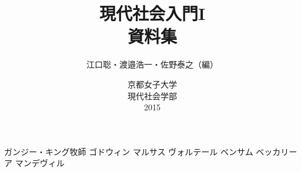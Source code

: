 \documentclass[dvipdfmx,openany,twocolumn]{jsbook}
\author{江口聡・渡邉浩一・佐野泰之（編）}
\date{京都女子大学\\現代社会学部\\2015}
\title{現代社会入門I\\資料集}
\begin{document}

\maketitle
\tableofcontents
% 

% 
% 

% 

% 

% 
% 




% 




% 


ガンジー・キング牧師
ゴドウィン
マルサス
ヴォルテール
ベンサム
ベッカリーア
マンデヴィル

\fi %





%   
% 
\end{document}
